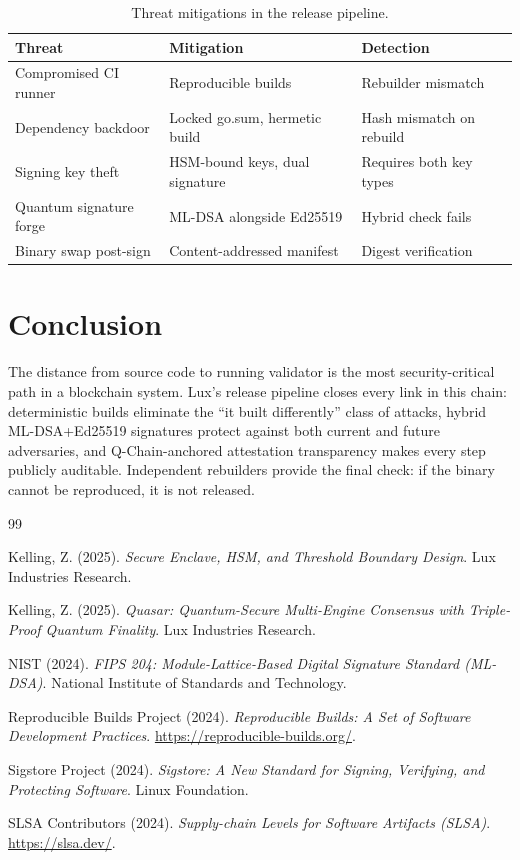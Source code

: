 \documentclass[11pt]{article}
\begin{document}
\begin{table}[h]
\centering
\small
\begin{tabular}{@{}lll@{}}
\toprule
\textbf{Threat} & \textbf{Mitigation} & \textbf{Detection} \\
\midrule
Compromised CI runner & Reproducible builds & Rebuilder mismatch \\
Dependency backdoor & Locked go.sum, hermetic build & Hash mismatch on rebuild \\
Signing key theft & HSM-bound keys, dual signature & Requires both key types \\
Quantum signature forge & ML-DSA alongside Ed25519 & Hybrid check fails \\
Binary swap post-sign & Content-addressed manifest & Digest verification \\
\bottomrule
\end{tabular}
\caption{Threat mitigations in the release pipeline.}
\label{tab:threats}
\end{table}

\section{Conclusion}

The distance from source code to running validator is the most security-critical path in a blockchain system. Lux's release pipeline closes every link in this chain: deterministic builds eliminate the ``it built differently'' class of attacks, hybrid ML-DSA+Ed25519 signatures protect against both current and future adversaries, and Q-Chain-anchored attestation transparency makes every step publicly auditable. Independent rebuilders provide the final check: if the binary cannot be reproduced, it is not released.

\begin{thebibliography}{99}

Kelling, Z. (2025).
\textit{Secure Enclave, HSM, and Threshold Boundary Design}.
Lux Industries Research.

Kelling, Z. (2025).
\textit{Quasar: Quantum-Secure Multi-Engine Consensus with Triple-Proof Quantum Finality}.
Lux Industries Research.

NIST (2024).
\textit{FIPS 204: Module-Lattice-Based Digital Signature Standard (ML-DSA)}.
National Institute of Standards and Technology.

Reproducible Builds Project (2024).
\textit{Reproducible Builds: A Set of Software Development Practices}.
\url{https://reproducible-builds.org/}.

Sigstore Project (2024).
\textit{Sigstore: A New Standard for Signing, Verifying, and Protecting Software}.
Linux Foundation.

SLSA Contributors (2024).
\textit{Supply-chain Levels for Software Artifacts (SLSA)}.
\url{https://slsa.dev/}.

\end{thebibliography}
\end{document}
